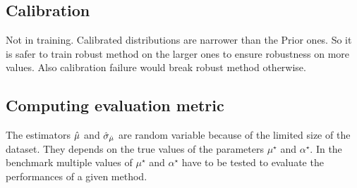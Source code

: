 \subsection{Calibration} %
\label{sub:calibration}


Not in training.
Calibrated distributions are narrower than the Prior ones.
So it is safer to train robust method on the larger ones to ensure robustness on more values.
Also calibration failure would break robust method otherwise. 







\subsection{Computing evaluation metric} %
\label{sub:computing_evaluation_metric}


The estimators $\hat\mu$ and $\hat\sigma_{\hat\mu}$ are random variable because of the limited size of the dataset.
They depends on the true values of the parameters $\mu^\star$ and $\alpha^\star$.
In the benchmark multiple values of $\mu^\star$ and $\alpha^\star$ have to be tested to evaluate the performances of a given method.


















